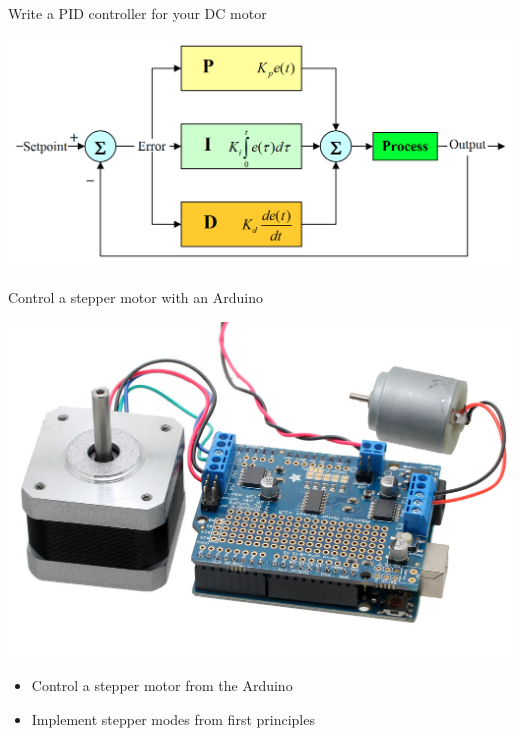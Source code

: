 \documentclass[compress]{beamer}
\begin{document}
\begin{frame}{Write a PID controller for your DC motor}
    \begin{center}
        \includegraphics[width=0.8\linewidth]{pid}
    \end{center}
\end{frame}

\begin{frame}{Control a stepper motor with an Arduino}
    \begin{center}
        \includegraphics[width=0.8\linewidth]{stepper}
    \end{center}

    \begin{itemize}
        \item Control a stepper motor from the Arduino
        \item Implement stepper modes from first principles
    \end{itemize}
\end{frame}
\end{document}
